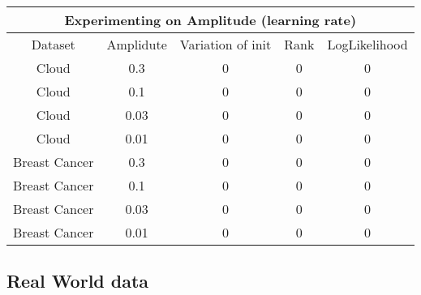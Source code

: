 \documentclass[a4paper]{article}
\begin{document}
\begin{center}
    \begin{tabular}{||c c c c c||} 
     \hline
     \multicolumn{5}{|c|}{Experimenting on Amplitude (learning rate)} \\
     \hline
     Dataset & Amplidute & Variation of init & Rank & LogLikelihood \\ [0.5ex] 
     \hline\hline
     Cloud & 0.3 & 0 & 0 & 0 \\
     \hline
     Cloud & 0.1 & 0 & 0 & 0 \\ 
     \hline
     Cloud & 0.03 & 0 & 0 & 0 \\ 
     \hline
     Cloud & 0.01 & 0 & 0 & 0 \\ 
     \hline
     Breast Cancer & 0.3 & 0 & 0 & 0 \\
     \hline
     Breast Cancer & 0.1 & 0 & 0 & 0 \\ 
     \hline
     Breast Cancer & 0.03 & 0 & 0 & 0 \\ 
     \hline
     Breast Cancer & 0.01 & 0 & 0 & 0 \\ [1ex] 
     \hline
    \end{tabular}
\end{center}

\subsection{Real World data}



\end{document}
